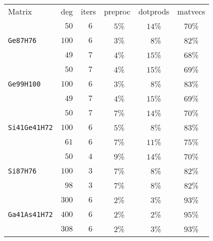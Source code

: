 \begin{tabular}{l|c|c|c|c|c}
\hline
\multirow{2}{*}{Matrix} & \multirow{2}{*}{deg} & \multirow{2}{*}{iters} & \multirow{2}{*}{preproc} & \multirow{2}{*}{dotprods} & \multirow{2}{*}{matvecs} \\
 & & & & & \\\hline
\hline
  & $\phantom{0}50$ & $\phantom{0}6$ & $\phantom{0}5$\% & $14$\% & $70$\%\\
\verb|Ge87H76| & $100$ & $\phantom{0}6$ & $\phantom{0}3$\% & $\phantom{0}8$\% & $82$\%\\
  & $\phantom{0}49$ & $\phantom{0}7$ & $\phantom{0}4$\% & $15$\% & $68$\%\\\hline
  & $\phantom{0}50$ & $\phantom{0}7$ & $\phantom{0}4$\% & $15$\% & $69$\%\\
\verb|Ge99H100| & $100$ & $\phantom{0}6$ & $\phantom{0}3$\% & $\phantom{0}8$\% & $83$\%\\
  & $\phantom{0}49$ & $\phantom{0}7$ & $\phantom{0}4$\% & $15$\% & $69$\%\\\hline
  & $\phantom{0}50$ & $\phantom{0}7$ & $\phantom{0}7$\% & $14$\% & $70$\%\\
\verb|Si41Ge41H72| & $100$ & $\phantom{0}6$ & $\phantom{0}5$\% & $\phantom{0}8$\% & $83$\%\\
  & $\phantom{0}61$ & $\phantom{0}6$ & $\phantom{0}7$\% & $11$\% & $75$\%\\\hline
  & $\phantom{0}50$ & $\phantom{0}4$ & $\phantom{0}9$\% & $14$\% & $70$\%\\
\verb|Si87H76| & $100$ & $\phantom{0}3$ & $\phantom{0}7$\% & $\phantom{0}8$\% & $82$\%\\
  & $\phantom{0}98$ & $\phantom{0}3$ & $\phantom{0}7$\% & $\phantom{0}8$\% & $82$\%\\\hline
  & $300$ & $\phantom{0}6$ & $\phantom{0}2$\% & $\phantom{0}3$\% & $93$\%\\
\verb|Ga41As41H72| & $400$ & $\phantom{0}6$ & $\phantom{0}2$\% & $\phantom{0}2$\% & $95$\%\\
  & $308$ & $\phantom{0}6$ & $\phantom{0}2$\% & $\phantom{0}3$\% & $93$\%\\\hline
\end{tabular}